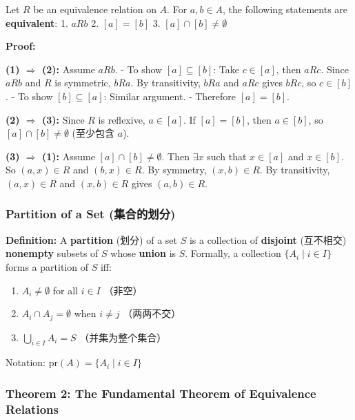 \documentclass[10pt,a4paper,openany]{ctexbook}
\theoremstyle{definition}
\theoremstyle{remark}
\renewenvironment{quote}
  {\list{}{\leftmargin=1em\rightmargin=0pt\topsep=0.5pt\partopsep=0pt}\item[]}
  {\endlist}
\begin{document}
\begin{quote}
Let $R$ be an equivalence relation on $A$. For $a, b \in A$, the following statements are \textbf{equivalent}:
1. $a R b$
2. $[a] = [b]$
3. $[a] \cap [b] \neq \emptyset$

\textbf{Proof:}

\textbf{(1) $\Rightarrow$ (2):} Assume $a R b$.
- To show $[a] \subseteq [b]$: Take $c \in [a]$, then $a R c$. Since $a R b$ and $R$ is symmetric, $b R a$. By transitivity, $b R a$ and $a R c$ gives $b R c$, so $c \in [b]$.
- To show $[b] \subseteq [a]$: Similar argument.
- Therefore $[a] = [b]$.

\textbf{(2) $\Rightarrow$ (3):} Since $R$ is reflexive, $a \in [a]$. If $[a] = [b]$, then $a \in [b]$, so $[a] \cap [b] \neq \emptyset$ (至少包含 $a$).

\textbf{(3) $\Rightarrow$ (1):} Assume $[a] \cap [b] \neq \emptyset$. Then $\exists x$ such that $x \in [a]$ and $x \in [b]$. So $(a,x) \in R$ and $(b,x) \in R$. By symmetry, $(x,b) \in R$. By transitivity, $(a,x) \in R$ and $(x,b) \in R$ gives $(a,b) \in R$.

\end{quote}

\subsubsection{Partition of a Set (集合的划分)}

\textbf{Definition:} A \textbf{partition} (划分) of a set $S$ is a collection of \textbf{disjoint} (互不相交) \textbf{nonempty} subsets of $S$ whose \textbf{union} is $S$.
Formally, a collection $\{A_i \mid i \in I\}$ forms a partition of $S$ iff:
\begin{enumerate}
\item $A_i \neq \emptyset$ for all $i \in I$ （非空）
\item $A_i \cap A_j = \emptyset$ when $i \neq j$ （两两不交）
\item $\bigcup_{i \in I} A_i = S$ （并集为整个集合）

\end{enumerate}

Notation: $\text{pr}(A) = \{A_i \mid i \in I\}$
\subsubsection{Theorem 2: The Fundamental Theorem of Equivalence Relations}
\end{document}
